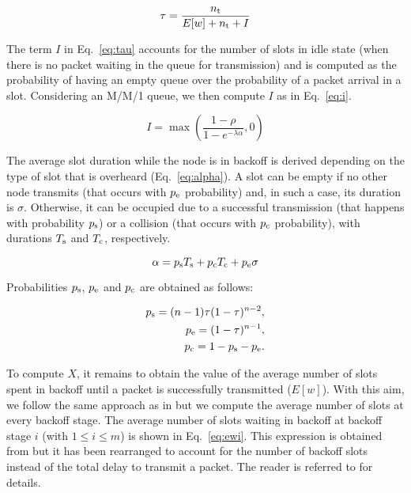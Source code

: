 \documentclass[preprint,12pt]{elsarticle}
\begin{document}
\begin{equation}\label{eq:tau}
 \tau=\frac{n_{\rm t}}{E[w]+n_{\rm t}+I}
\end{equation}

The term $I$ in Eq.~\ref{eq:tau} accounts for the number of slots in idle state (when there is no packet waiting in the queue for transmission) and is computed as the probability of having an empty queue over the probability of a packet arrival in a slot. Considering an M/M/1 queue, we then compute $I$ as in Eq.~\ref{eq:i}. 


\begin{equation}\label{eq:i}
 I=\max\left(\frac{1-\rho}{1-e^{-\lambda \alpha}},0\right)
\end{equation}

The average slot duration while the node is in backoff is derived depending on the type of slot that is overheard (Eq.~\ref{eq:alpha}). A slot can be empty if no other node transmits (that occurs with $p_{\rm e}$ probability) and, in such a case, its duration is $\sigma$. Otherwise, it can be occupied due to a successful transmission (that happens with probability $p_{\rm s}$) or a collision (that occurs with $p_{\rm c}$ probability), with durations $T_{\rm s}$ and $T_{\rm c}$, respectively. 

\begin{equation}\label{eq:alpha}
 \alpha=p_{\rm s}T_{\rm s} + p_{\rm c}T_{\rm c} + p_{\rm e}\sigma
\end{equation}

Probabilities $p_{\rm s}$, $p_{\rm e}$ and $p_{\rm c}$ are obtained as follows:

\begin{align}\label{eq:p_others}
  p_{\rm s}=(n-1)\tau (1-\tau)^{n-2},\nonumber\\
  p_{\rm e}=(1-\tau)^{n-1},\nonumber\\
  p_{\rm c}=1 - p_{\rm s} - p_{\rm e}.
\end{align}

To compute $X$, it remains to obtain the value of the average number of slots spent in backoff until a packet is successfully transmitted ($E[w]$). With this aim, we follow the same approach as in \cite{chung2006performance} but we compute the average number of slots at every backoff stage. The average number of slots waiting in backoff at backoff stage $i$ (with $1 \leq i \leq m$) is shown in Eq.~\ref{eq:ewi}. This expression is obtained from \cite{chung2006performance} but it has been rearranged to account for the number of backoff slots instead of the total delay to transmit a packet. The reader is referred to \cite{chung2006performance} for details. 
\end{document}
